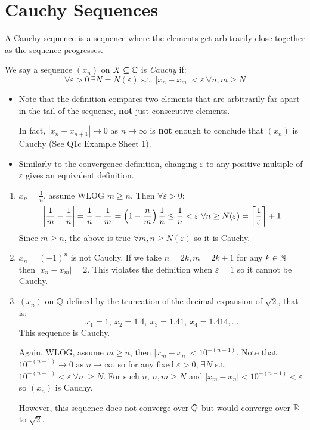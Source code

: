 \documentclass[../main.tex]{subfiles}
\begin{document}
\section{Cauchy Sequences}
A Cauchy sequence is a sequence where the elements get arbitrarily close together as the sequence progresses.
\begin{definition}
  We say a sequence $(x_n)$ on $X \subseteq \mathbb{C}$ is \textit{Cauchy} if:
  \label{cauchyDef}
  \[
    \forall \varepsilon > 0\ \exists N = N(\varepsilon) \text{ s.t. } |x_n - x_m| < \varepsilon\ \forall n, m \geq N
  \]
\end{definition}
\begin{remark}[Remarks]
  \begin{itemize}
    \item Note that the definition compares two elements that are arbitrarily far apart in the tail of the sequence, \textbf{not} just consecutive elements.

      In fact, $|x_n - x_{n + 1}| \to 0$ as $n \to \infty$ is \textbf{not} enough to conclude that $(x_n)$ is Cauchy (See Q1c Example Sheet 1).
    \item Similarly to the convergence definition, changing $\varepsilon$ to any positive multiple of $\varepsilon$ gives an equivalent definition.
  \end{itemize}
\end{remark}
\begin{example}
  \label{cauchyExample}
  \begin{enumerate}
    \item $x_n = \frac{1}{n}$, assume WLOG $m \geq n$.
      Then $\forall \varepsilon > 0$:
      \[
        \left\lvert \frac{1}{m} - \frac{1}{n} \right\rvert = \frac{1}{n} - \frac{1}{m} = \left(1 - \frac{n}{m}\right) \frac{1}{n} \leq \frac{1}{n} < \varepsilon\ \forall n \geq N(\varepsilon) = \left\lceil \frac{1}{\varepsilon} \right\rceil + 1
      \]
      Since $m \geq n$, the above is true $\forall m, n \geq N(\varepsilon)$ so it is Cauchy.
    \item $x_n = (-1)^{n}$ is not Cauchy.
      If we take $n = 2k, m = 2k + 1$ for any $k \in \mathbb{N}$ then $|x_n - x_m| = 2$.
      This violates the definition when $\varepsilon = 1$ so it cannot be Cauchy.
    \item $(x_n)$ on $\mathbb{Q}$ defined by the truncation of the decimal expansion of $\sqrt{2}$, that is:
      \[
        x_1 = 1,\ x_2 = 1.4,\ x_3 = 1.41,\ x_4 = 1.414, \ldots
      \]
      This sequence is Cauchy.

      Again, WLOG, assume $m \geq n$, then $|x_m - x_n| < 10^{-(n - 1)}$.
      Note that $10^{-(n - 1)} \to 0 \text{ as } n \to \infty$, so for any fixed $\varepsilon > 0$, $\exists N$ s.t. $10^{-(n - 1)} < \varepsilon\ \forall n\ \geq N$.
      For such $n$, $n, m \geq N$ and $|x_m - x_n| < 10^{- (n - 1)} < \varepsilon$ so $(x_n)$ is Cauchy.

      However, this sequence does not converge over $\mathbb{Q}$ but would converge over $\mathbb{R}$ to $\sqrt{2}$.
  \end{enumerate}
\end{example}
\end{document}
